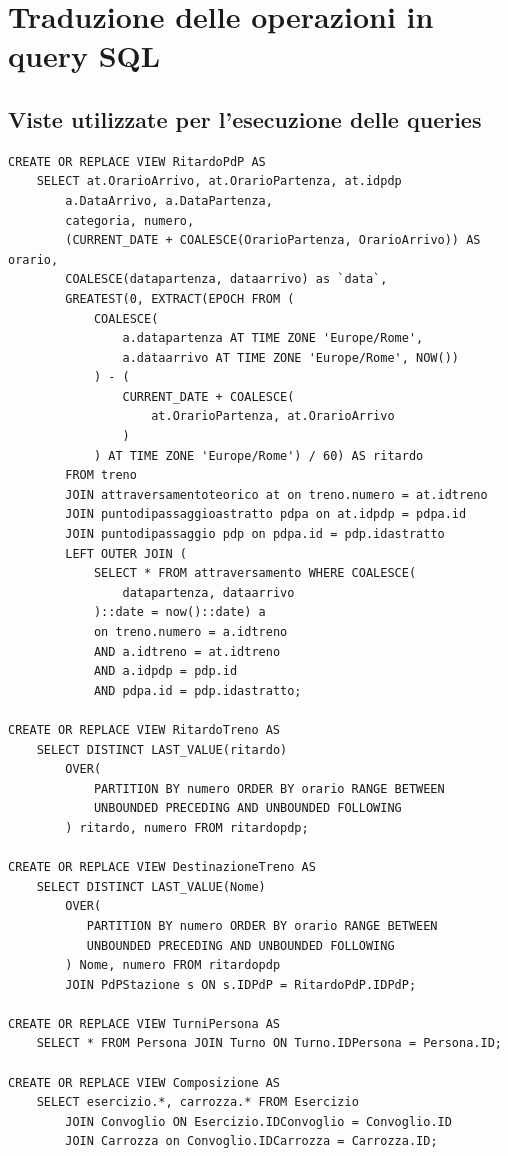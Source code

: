 \documentclass[a4paper,12pt]{report}
\begin{document}
	\section{Traduzione delle operazioni in query SQL}
	\subsection{Viste utilizzate per l'esecuzione delle queries}
	\begin{verbatim}
CREATE OR REPLACE VIEW RitardoPdP AS
    SELECT at.OrarioArrivo, at.OrarioPartenza, at.idpdp
        a.DataArrivo, a.DataPartenza,
        categoria, numero,
        (CURRENT_DATE + COALESCE(OrarioPartenza, OrarioArrivo)) AS orario,
        COALESCE(datapartenza, dataarrivo) as `data`,
        GREATEST(0, EXTRACT(EPOCH FROM (
            COALESCE(
                a.datapartenza AT TIME ZONE 'Europe/Rome',
                a.dataarrivo AT TIME ZONE 'Europe/Rome', NOW())
            ) - (
                CURRENT_DATE + COALESCE(
                    at.OrarioPartenza, at.OrarioArrivo
                )
            ) AT TIME ZONE 'Europe/Rome') / 60) AS ritardo
        FROM treno
        JOIN attraversamentoteorico at on treno.numero = at.idtreno
        JOIN puntodipassaggioastratto pdpa on at.idpdp = pdpa.id
        JOIN puntodipassaggio pdp on pdpa.id = pdp.idastratto
        LEFT OUTER JOIN (
            SELECT * FROM attraversamento WHERE COALESCE(
                datapartenza, dataarrivo
            )::date = now()::date) a
            on treno.numero = a.idtreno
            AND a.idtreno = at.idtreno
            AND a.idpdp = pdp.id
            AND pdpa.id = pdp.idastratto;

CREATE OR REPLACE VIEW RitardoTreno AS
    SELECT DISTINCT LAST_VALUE(ritardo)
        OVER(
            PARTITION BY numero ORDER BY orario RANGE BETWEEN
            UNBOUNDED PRECEDING AND UNBOUNDED FOLLOWING
        ) ritardo, numero FROM ritardopdp;

CREATE OR REPLACE VIEW DestinazioneTreno AS
    SELECT DISTINCT LAST_VALUE(Nome)
        OVER(
           PARTITION BY numero ORDER BY orario RANGE BETWEEN
           UNBOUNDED PRECEDING AND UNBOUNDED FOLLOWING
        ) Nome, numero FROM ritardopdp
        JOIN PdPStazione s ON s.IDPdP = RitardoPdP.IDPdP;

CREATE OR REPLACE VIEW TurniPersona AS
    SELECT * FROM Persona JOIN Turno ON Turno.IDPersona = Persona.ID;

CREATE OR REPLACE VIEW Composizione AS
    SELECT esercizio.*, carrozza.* FROM Esercizio
        JOIN Convoglio ON Esercizio.IDConvoglio = Convoglio.ID
        JOIN Carrozza on Convoglio.IDCarrozza = Carrozza.ID;
	\end{verbatim}
\end{document}
